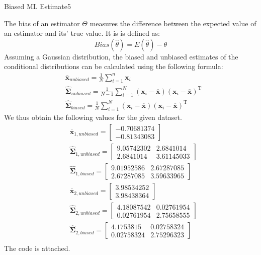 \begin{questions}
\begin{question}{Biased ML Estimate}{5}
\begin{answer}
The bias of an estimator $\Theta$ measures the difference between the expected value of an estimator and its' true value. It is is defined as:
\begin{equation*}
Bias(\widehat{\theta})= E(\widehat{\theta}) - \theta
\end{equation*}
Assuming a Gaussian distribution, the biased and unbiased estimates of the conditional distributions can be calculated using the following formula:
\begin{align*}
&\overline{\mathbf{x}}_{unbiased}= \frac{1}{N} \sum_{i=1}^{n} \mathbf{x}_{i} \\
&\widehat{\boldsymbol{\Sigma}}_{unbiased}=\frac{1}{N-1} \sum_{i=1}^{N}(\mathbf{x}_{i}-\overline{\mathbf{x}})(\mathbf{x}_{i}-\overline{\mathbf{x}})^{\mathrm{T}} \\
&\widehat{\boldsymbol{\Sigma}}_{biased}=\frac{1}{N} \sum_{i=1}^{N}(\mathbf{x}_{i}-\overline{\mathbf{x}})(\mathbf{x}_{i}-\overline{\mathbf{x}})^{\mathrm{T}}
\end{align*}
We thus obtain the following values for the given dataset.
\begin{align*}
&\overline{\mathbf{x}}_{1, unbiased} =  
\begin{bmatrix} 
-0.70681374 \\
 -0.81343083
\end{bmatrix}\\
&\widehat{\boldsymbol{\Sigma}}_{1, unbiased} =
\begin{bmatrix} 
9.05742302 & 2.6841014 \\
2.6841014 & 3.61145033 
\end{bmatrix}
\\
&\widehat{\boldsymbol{\Sigma}}_{1, biased} =
\begin{bmatrix} 
9.01952586 & 2.67287085 \\
2.67287085 & 3.59633965 
\end{bmatrix}
\\
&\overline{\mathbf{x}}_{2, unbiased} =
\begin{bmatrix} 
3.98534252 \\
3.98438364
\end{bmatrix}\\
&\widehat{\boldsymbol{\Sigma}}_{2, unbiased} =
\begin{bmatrix} 
4.18087542  & 0.02761954 \\
0.02761954 & 2.75658555 
\end{bmatrix}
\\
&\widehat{\boldsymbol{\Sigma}}_{2, biased} =
\begin{bmatrix} 
4.1753815 & 0.02758324 \\
0.02758324 & 2.75296323
\end{bmatrix}
\\
\end{align*}
The code is attached.

\end{answer}
\end{question}



\end{questions}
